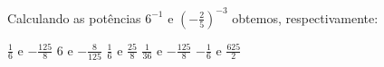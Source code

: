 Calculando as potências $6^{-1}$ e $\left(-\frac{2}{5}\right)^{-3}$ obtemos, respectivamente:

$\frac{1}{6}$ e $-\frac{125}{8}$
$6$ e $-\frac{8}{125}$
$\frac{1}{6}$ e $\frac{25}{8}$
$\frac{1}{36}$ e $-\frac{125}{8}$
$-\frac{1}{6}$ e $\frac{625}{2}$


